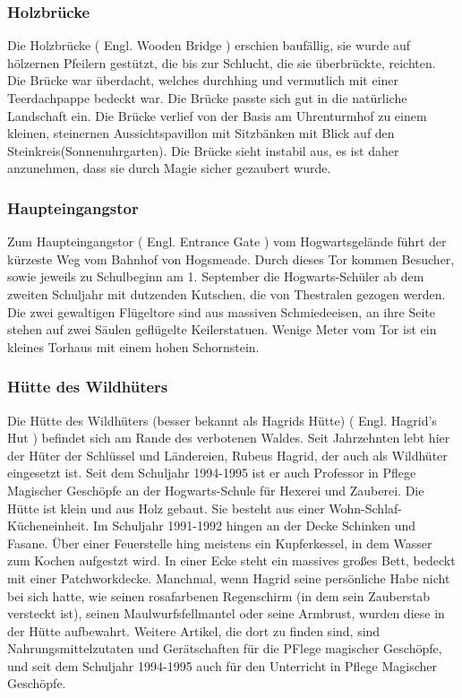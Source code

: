 \documentclass[a4paper, 10pt]{article}
\begin{document}
\subsubsection*{\large Holzbrücke}
Die Holzbrücke (  Engl.  Wooden Bridge ) erschien baufällig, sie wurde auf hölzernen Pfeilern gestützt, die bis zur Schlucht, die sie überbrückte, reichten. Die Brücke war überdacht, welches durchhing und vermutlich mit einer Teerdachpappe bedeckt war. Die Brücke passte sich gut in die natürliche Landschaft ein.
\vspace{10pt}
\newline
Die Brücke verlief von der Basis am Uhrenturmhof zu einem kleinen, steinernen Aussichtspavillon mit Sitzbänken mit Blick auf den Steinkreis(Sonnenuhrgarten). Die Brücke sieht instabil aus, es ist daher anzunehmen, dass sie durch Magie sicher gezaubert wurde.

\subsubsection*{\large Haupteingangstor}
Zum Haupteingangstor (  Engl.  Entrance Gate ) vom Hogwartsgelände führt der kürzeste Weg vom Bahnhof von Hogsmeade. Durch dieses Tor kommen Besucher, sowie jeweils zu Schulbeginn am 1. September die Hogwarts-Schüler ab dem zweiten Schuljahr mit dutzenden Kutschen, die von Thestralen gezogen werden. Die zwei gewaltigen Flügeltore sind aus massiven Schmiedeeisen, an ihre Seite stehen auf zwei Säulen geflügelte Keilerstatuen. Wenige Meter vom Tor ist ein kleines Torhaus mit einem hohen Schornstein.
\subsubsection*{\large Hütte des Wildhüters}
Die Hütte des Wildhüters (besser bekannt als Hagrids Hütte) (  Engl.  Hagrid's Hut ) befindet sich am Rande des verbotenen Waldes. Seit Jahrzehnten lebt hier der Hüter der Schlüssel und Ländereien, Rubeus Hagrid, der auch als Wildhüter eingesetzt ist. Seit dem Schuljahr 1994-1995 ist er auch Professor in Pflege Magischer Geschöpfe an der Hogwarts-Schule für Hexerei und Zauberei.
\vspace{10pt}
\newline
Die Hütte ist klein und aus Holz gebaut. Sie besteht aus einer Wohn-Schlaf-Kücheneinheit. Im Schuljahr 1991-1992 hingen an der Decke Schinken und Fasane. Über einer Feuerstelle hing meistens ein Kupferkessel, in dem Wasser zum Kochen aufgestzt wird. In einer Ecke steht ein massives großes Bett, bedeckt mit einer Patchworkdecke. Manchmal, wenn Hagrid seine persönliche Habe nicht bei sich hatte, wie seinen rosafarbenen Regenschirm (in dem sein Zauberstab versteckt ist), seinen Maulwurfsfellmantel oder seine Armbrust, wurden diese in der Hütte aufbewahrt. Weitere Artikel, die dort zu finden sind, sind Nahrungsmittelzutaten und Gerätschaften für die PFlege magischer Geschöpfe, und seit dem Schuljahr 1994-1995 auch für den Unterricht in Pflege Magischer Geschöpfe.
\end{document}
